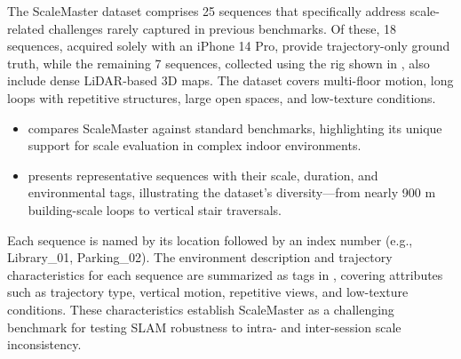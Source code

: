 The ScaleMaster dataset comprises 25 sequences that specifically address scale-related challenges rarely captured in previous benchmarks. Of these, 18 sequences, acquired solely with an iPhone 14 Pro, provide trajectory-only ground truth, while the remaining 7 sequences, collected using the rig shown in , also include dense LiDAR-based 3D maps. The dataset covers multi-floor motion, long loops with repetitive structures, large open spaces, and low-texture conditions.

\begin{itemize}
  \item \textbf{} compares ScaleMaster against standard benchmarks, highlighting its unique support for scale evaluation in complex indoor environments.

  \item \textbf{} presents representative sequences with their scale, duration, and environmental tags, illustrating the dataset’s diversity—from nearly 900 m building-scale loops to vertical stair traversals.

\end{itemize}

Each sequence is named by its location followed by an index number (e.g., Library\_01, Parking\_02). The environment description and trajectory characteristics for each sequence are summarized as tags in , covering attributes such as trajectory type, vertical motion, repetitive views, and low-texture conditions. These characteristics establish ScaleMaster as a challenging benchmark for testing SLAM robustness to intra- and inter-session scale inconsistency.



